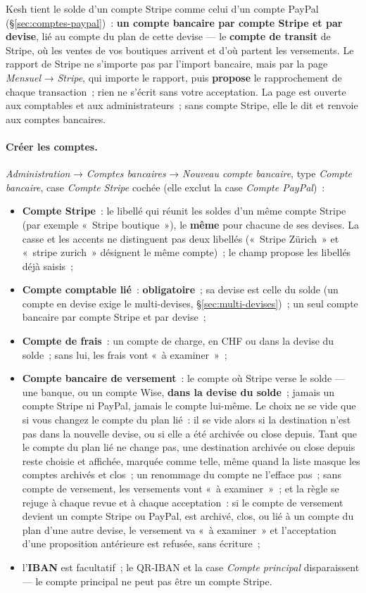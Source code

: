 \documentclass[a4paper,11pt,oneside]{article}
\begin{document}
Kesh tient le solde d'un compte Stripe comme celui d'un compte PayPal (\S\ref{sec:comptes-paypal})~: \textbf{un compte bancaire par compte Stripe et par devise}, lié au compte du plan de cette devise --- le \textbf{compte de transit} de Stripe, où les ventes de vos boutiques arrivent et d'où partent les versements. Le rapport de Stripe ne s'importe pas par l'import bancaire, mais par la page \emph{Mensuel} → \emph{Stripe}, qui importe le rapport, puis \textbf{propose} le rapprochement de chaque transaction~; rien ne s'écrit sans votre acceptation. La page est ouverte aux comptables et aux administrateurs~; sans compte Stripe, elle le dit et renvoie aux comptes bancaires.

\paragraph{Créer les comptes.} \emph{Administration} → \emph{Comptes bancaires} → \emph{Nouveau compte bancaire}, type \emph{Compte bancaire}, case \emph{Compte Stripe} cochée (elle exclut la case \emph{Compte PayPal})~:
\begin{itemize}
    \item \textbf{Compte Stripe}~: le libellé qui réunit les soldes d'un même compte Stripe (par exemple «~Stripe boutique~»), le \textbf{même} pour chacune de ses devises. La casse et les accents ne distinguent pas deux libellés («~Stripe Zürich~» et «~stripe zurich~» désignent le même compte)~; le champ propose les libellés déjà saisis~;
    \item \textbf{Compte comptable lié}~: \textbf{obligatoire}~; sa devise est celle du solde (un compte en devise exige le multi-devises, \S\ref{sec:multi-devises})~; un seul compte bancaire par compte Stripe et par devise~;
    \item \textbf{Compte de frais}~: un compte de charge, en CHF ou dans la devise du solde~; sans lui, les frais vont «~à examiner~»~;
    \item \textbf{Compte bancaire de versement}~: le compte où Stripe verse le solde --- une banque, ou un compte Wise, \textbf{dans la devise du solde}~; jamais un compte Stripe ni PayPal, jamais le compte lui-même. Le choix ne se vide que si vous changez le compte du plan lié~: il se vide alors si la destination n'est pas dans la nouvelle devise, ou si elle a été archivée ou close depuis. Tant que le compte du plan lié ne change pas, une destination archivée ou close depuis reste choisie et affichée, marquée comme telle, même quand la liste masque les comptes archivés et clos~; un renommage du compte ne l'efface pas~; sans compte de versement, les versements vont «~à examiner~»~; et la règle se rejuge à chaque revue et à chaque acceptation~: si le compte de versement devient un compte Stripe ou PayPal, est archivé, clos, ou lié à un compte du plan d'une autre devise, le versement va «~à examiner~» et l'acceptation d'une proposition antérieure est refusée, sans écriture~;
    \item l'\textbf{IBAN} est facultatif~; le QR-IBAN et la case \emph{Compte principal} disparaissent --- le compte principal ne peut pas être un compte Stripe.
\end{itemize}
\end{document}

